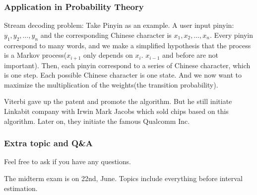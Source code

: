 \documentclass{beamer}
\begin{document}
\begin{frame}
    \frametitle{Application in Probability Theory}
    Stream decoding problem: Take Pinyin as an example. A user input pinyin: $y_1, y_2, \dots , y_n$ and the corresponding Chinese character is $x_1, x_2, \dots , x_n$. Every pinyin correspond to many words, and we make a simplified hypothesis that the process is a Markov process($x_{i+1}$ only depends on $x_{i}$. $x_{i-1}$ and before are not important). Then, each pinyin correspond to a series of Chinese character, which is one step. Each possible Chinese character is one state. And we now want to maximize the multiplication of the weights(the transition probability).\par
    \vspace{0.3cm}
    Viterbi gave up the patent and promote the algorithm. But he still initiate Linkabit company with Irwin Mark Jacobs which sold chips based on this algorithm. Later on, they initiate the famous Qualcomm Inc.

\end{frame}

\begin{frame}
    \frametitle{Extra topic and Q\&A}
    
    Feel free to ask if you have any questions.\par
    The midterm exam is on 22nd, June. Topics include everything before interval estimation.
    
    
\end{frame}
\end{document}
